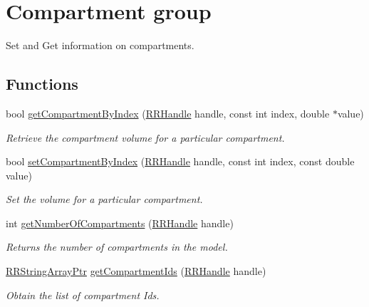 \hypertarget{group__compartment}{\section{Compartment group}
\label{group__compartment}
}


Set and Get information on compartments.  


\subsection*{Functions}
\begin{DoxyCompactItemize}
\item 
bool \hyperlink{group__compartment_ga9de42b53c1d31e477f7172d170a53d65}{get\-Compartment\-By\-Index} (\hyperlink{rrc__types_8h_a1d68f0592372208fa5a5f2799ea4b3ae}{R\-R\-Handle} handle, const int index, double $\ast$value)
\begin{DoxyCompactList}\small\item\em Retrieve the compartment volume for a particular compartment. \end{DoxyCompactList}\item 
bool \hyperlink{group__compartment_gaebcce9341fbd6568d8076e595d54818c}{set\-Compartment\-By\-Index} (\hyperlink{rrc__types_8h_a1d68f0592372208fa5a5f2799ea4b3ae}{R\-R\-Handle} handle, const int index, const double value)
\begin{DoxyCompactList}\small\item\em Set the volume for a particular compartment. \end{DoxyCompactList}\item 
int \hyperlink{group__compartment_gabc437da46732973852cbbc11a03843d7}{get\-Number\-Of\-Compartments} (\hyperlink{rrc__types_8h_a1d68f0592372208fa5a5f2799ea4b3ae}{R\-R\-Handle} handle)
\begin{DoxyCompactList}\small\item\em Returns the number of compartments in the model. \end{DoxyCompactList}\item 
\hyperlink{rrc__types_8h_a7c9475df6c7337d99482b13a365e7596}{R\-R\-String\-Array\-Ptr} \hyperlink{group__compartment_ga49d71e059c4ccdf92d0a48d180174ec1}{get\-Compartment\-Ids} (\hyperlink{rrc__types_8h_a1d68f0592372208fa5a5f2799ea4b3ae}{R\-R\-Handle} handle)
\begin{DoxyCompactList}\small\item\em Obtain the list of compartment Ids. \end{DoxyCompactList}\end{DoxyCompactItemize}


